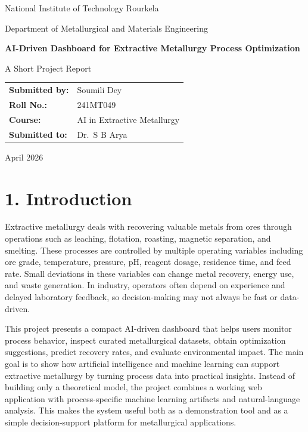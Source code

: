 \documentclass[12pt,a4paper]{article}
\begin{document}

\begin{titlepage}
\centering
\vspace*{1.8cm}

{\Large National Institute of Technology Rourkela\par}
\vspace{0.3cm}
{\large Department of Metallurgical and Materials Engineering\par}
\vspace{2.2cm}

{\LARGE\bfseries AI-Driven Dashboard for Extractive Metallurgy Process Optimization\par}
\vspace{0.8cm}

{\large A Short Project Report\par}
\vspace{2.2cm}

\begin{tabular}{>{\bfseries}p{4cm}p{8cm}}
Submitted by: & Soumili Dey \\
Roll No.: & 241MT049 \\
Course: & AI in Extractive Metallurgy \\
Submitted to: & Dr.\ S B Arya \\
\end{tabular}

\vfill
{\large April 2026\par}
\end{titlepage}

\clearpage
{}

\section*{1. Introduction}

Extractive metallurgy deals with recovering valuable metals from ores through operations such as leaching, flotation, roasting, magnetic separation, and smelting. These processes are controlled by multiple operating variables including ore grade, temperature, pressure, pH, reagent dosage, residence time, and feed rate. Small deviations in these variables can change metal recovery, energy use, and waste generation. In industry, operators often depend on experience and delayed laboratory feedback, so decision-making may not always be fast or data-driven.

This project presents a compact AI-driven dashboard that helps users monitor process behavior, inspect curated metallurgical datasets, obtain optimization suggestions, predict recovery rates, and evaluate environmental impact. The main goal is to show how artificial intelligence and machine learning can support extractive metallurgy by turning process data into practical insights. Instead of building only a theoretical model, the project combines a working web application with process-specific machine learning artifacts and natural-language analysis. This makes the system useful both as a demonstration tool and as a simple decision-support platform for metallurgical applications.
\end{document}

